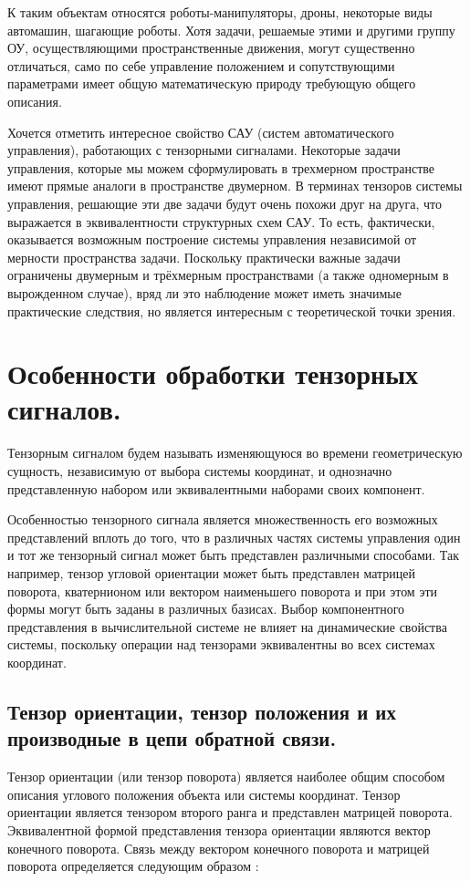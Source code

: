 \documentclass[a4paper]{article}
\begin{document}
К таким объектам относятся роботы-манипуляторы, дроны, некоторые виды автомашин, шагающие роботы. 
Хотя задачи, решаемые этими и другими группу ОУ, осуществляющими пространственные движения, могут существенно отличаться, само по себе управление положением и сопутствующими параметрами имеет общую математическую природу требующую общего описания.

Хочется отметить интересное свойство САУ (систем автоматического управления), работающих с тензорными сигналами. Некоторые задачи управления, которые мы можем сформулировать в трехмерном пространстве имеют прямые аналоги в пространстве двумерном. В терминах тензоров системы управления, решающие эти две задачи будут очень похожи друг на друга, что выражается в эквивалентности структурных схем САУ. То есть, фактически, оказывается возможным построение системы управления независимой от мерности пространства задачи. Поскольку практически важные задачи ограничены двумерным и трёхмерным пространствами (а также одномерным в вырожденном случае), вряд ли это наблюдение может иметь значимые практические следствия, но является интересным с теоретической точки зрения. 

\section{Особенности обработки тензорных сигналов.} \label{osobtens}
Тензорным сигналом будем называть изменяющуюся во времени геометрическую сущность, независимую от выбора системы координат, и однозначно представленную набором или эквивалентными наборами своих компонент. 

Особенностью тензорного сигнала является множественность его возможных представлений вплоть до того, что в различных частях системы управления один и тот же тензорный сигнал может быть представлен различными способами. Так например, тензор угловой ориентации может быть представлен матрицей поворота, кватернионом или вектором наименьшего поворота и при этом эти формы могут быть заданы в различных базисах. Выбор компонентного представления в вычислительной системе не влияет на динамические свойства системы, поскольку операции над тензорами эквивалентны во всех системах координат.

\subsection{Тензор ориентации, тензор положения и их производные в цепи обратной связи. }
Тензор ориентации (или тензор поворота) является наиболее общим способом описания углового положения объекта или системы координат. Тензор ориентации является тензором второго ранга и представлен матрицей поворота. Эквивалентной формой представления тензора ориентации являются вектор конечного поворота. Связь между вектором конечного поворота и матрицей поворота определяется следующим образом \cite{zhilin}:
\end{document}

